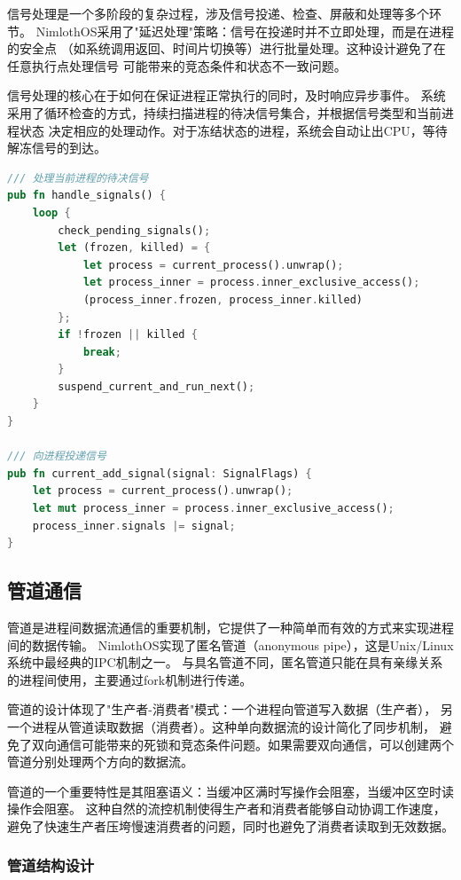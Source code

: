 信号处理是一个多阶段的复杂过程，涉及信号投递、检查、屏蔽和处理等多个环节。
NimlothOS采用了"延迟处理"策略：信号在投递时并不立即处理，而是在进程的安全点
（如系统调用返回、时间片切换等）进行批量处理。这种设计避免了在任意执行点处理信号
可能带来的竞态条件和状态不一致问题。

信号处理的核心在于如何在保证进程正常执行的同时，及时响应异步事件。
系统采用了循环检查的方式，持续扫描进程的待决信号集合，并根据信号类型和当前进程状态
决定相应的处理动作。对于冻结状态的进程，系统会自动让出CPU，等待解冻信号的到达。

\begin{lstlisting}[language=Rust,caption={信号处理实现}, label={lst:signal-handling}]
/// 处理当前进程的待决信号
pub fn handle_signals() {
    loop {
        check_pending_signals();
        let (frozen, killed) = {
            let process = current_process().unwrap();
            let process_inner = process.inner_exclusive_access();
            (process_inner.frozen, process_inner.killed)
        };
        if !frozen || killed {
            break;
        }
        suspend_current_and_run_next();
    }
}

/// 向进程投递信号
pub fn current_add_signal(signal: SignalFlags) {
    let process = current_process().unwrap();
    let mut process_inner = process.inner_exclusive_access();
    process_inner.signals |= signal;
}
\end{lstlisting}

\subsection{管道通信}

管道是进程间数据流通信的重要机制，它提供了一种简单而有效的方式来实现进程间的数据传输。
NimlothOS实现了匿名管道（anonymous pipe），这是Unix/Linux系统中最经典的IPC机制之一。
与具名管道不同，匿名管道只能在具有亲缘关系的进程间使用，主要通过fork机制进行传递。

管道的设计体现了"生产者-消费者"模式：一个进程向管道写入数据（生产者），
另一个进程从管道读取数据（消费者）。这种单向数据流的设计简化了同步机制，
避免了双向通信可能带来的死锁和竞态条件问题。如果需要双向通信，可以创建两个管道分别处理两个方向的数据流。

管道的一个重要特性是其阻塞语义：当缓冲区满时写操作会阻塞，当缓冲区空时读操作会阻塞。
这种自然的流控机制使得生产者和消费者能够自动协调工作速度，
避免了快速生产者压垮慢速消费者的问题，同时也避免了消费者读取到无效数据。

\subsubsection{管道结构设计}

